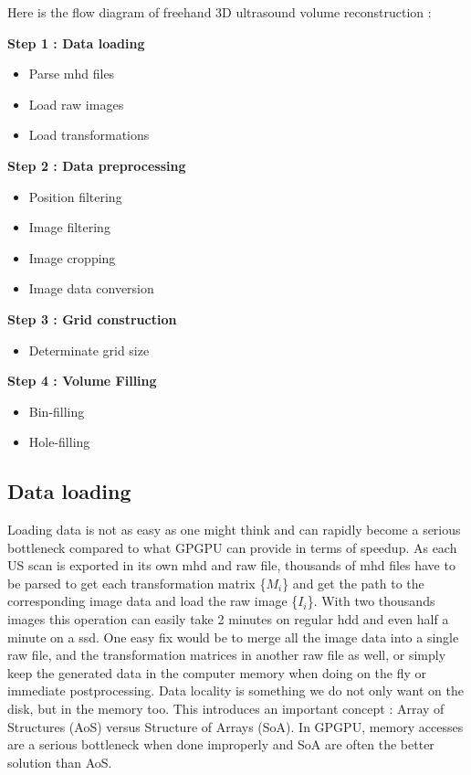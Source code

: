 \documentclass[12pt,journal,compsoc]{IEEEtran}
\begin{document}
\newpage
Here is the flow diagram of freehand 3D ultrasound volume reconstruction :
\begin{framed}
\noindent\textbf{Step 1 : Data loading}
\begin{itemize}
	\item Parse mhd files
	\item Load raw images
	\item Load transformations
\end{itemize}
\textbf{Step 2 : Data preprocessing}
\begin{itemize}
	\item Position filtering
	\item Image filtering
	\item Image cropping
	\item Image data conversion
\end{itemize}
\textbf{Step 3 : Grid construction}
\begin{itemize}
	\item Determinate grid size
\end{itemize}
\textbf{Step 4 : Volume Filling}
\begin{itemize}
	\item Bin-filling
	\item Hole-filling
\end{itemize}
\end{framed}

\subsection{Data loading}

Loading data is not as easy as one might think and can rapidly become a serious bottleneck compared to what GPGPU can provide in terms of speedup. 
As each US scan is exported in its own mhd and raw file, thousands of mhd files have to be parsed to get each transformation matrix \{$M_i$\} and get the path to the corresponding image data and load the raw image \{$I_i$\}.  
With two thousands images this operation can easily take 2 minutes on regular \ac{hdd} and even half a minute on a \ac{ssd}.
One easy fix would be to merge all the image data into a single raw file, and the transformation matrices in another raw file as well, or simply keep the generated data in the computer memory when doing on the fly or immediate postprocessing.
Data locality is something we do not only want on the disk, but in the memory too. This introduces an important concept : Array of Structures (AoS) versus Structure of Arrays (SoA). In GPGPU, memory accesses are a serious bottleneck when done improperly and SoA are often the better solution than AoS. 
\end{document}
